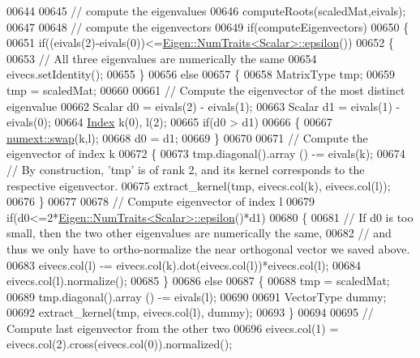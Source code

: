 \begin{DoxyCode}
00644 
00645     \textcolor{comment}{// compute the eigenvalues}
00646     computeRoots(scaledMat,eivals);
00647 
00648     \textcolor{comment}{// compute the eigenvectors}
00649     \textcolor{keywordflow}{if}(computeEigenvectors)
00650     \{
00651       \textcolor{keywordflow}{if}((eivals(2)-eivals(0))<=\hyperlink{group___core___module_struct_eigen_1_1_num_traits}{Eigen::NumTraits<Scalar>::epsilon}())
00652       \{
00653         \textcolor{comment}{// All three eigenvalues are numerically the same}
00654         eivecs.setIdentity();
00655       \}
00656       \textcolor{keywordflow}{else}
00657       \{
00658         MatrixType tmp;
00659         tmp = scaledMat;
00660 
00661         \textcolor{comment}{// Compute the eigenvector of the most distinct eigenvalue}
00662         Scalar d0 = eivals(2) - eivals(1);
00663         Scalar d1 = eivals(1) - eivals(0);
00664         \hyperlink{namespace_eigen_a62e77e0933482dafde8fe197d9a2cfde}{Index} k(0), l(2);
00665         \textcolor{keywordflow}{if}(d0 > d1)
00666         \{
00667           \hyperlink{endian_8c_a3ca5ecd34b04d6a243c054ac3a57f68d}{numext::swap}(k,l);
00668           d0 = d1;
00669         \}
00670 
00671         \textcolor{comment}{// Compute the eigenvector of index k}
00672         \{
00673           tmp.diagonal().array () -= eivals(k);
00674           \textcolor{comment}{// By construction, 'tmp' is of rank 2, and its kernel corresponds to the respective eigenvector.}
00675           extract\_kernel(tmp, eivecs.col(k), eivecs.col(l));
00676         \}
00677 
00678         \textcolor{comment}{// Compute eigenvector of index l}
00679         \textcolor{keywordflow}{if}(d0<=2*\hyperlink{group___core___module_struct_eigen_1_1_num_traits}{Eigen::NumTraits<Scalar>::epsilon}()*d1)
00680         \{
00681           \textcolor{comment}{// If d0 is too small, then the two other eigenvalues are numerically the same,}
00682           \textcolor{comment}{// and thus we only have to ortho-normalize the near orthogonal vector we saved above.}
00683           eivecs.col(l) -= eivecs.col(k).dot(eivecs.col(l))*eivecs.col(l);
00684           eivecs.col(l).normalize();
00685         \}
00686         \textcolor{keywordflow}{else}
00687         \{
00688           tmp = scaledMat;
00689           tmp.diagonal().array () -= eivals(l);
00690 
00691           VectorType dummy;
00692           extract\_kernel(tmp, eivecs.col(l), dummy);
00693         \}
00694 
00695         \textcolor{comment}{// Compute last eigenvector from the other two}
00696         eivecs.col(1) = eivecs.col(2).cross(eivecs.col(0)).normalized();

\end{DoxyCode}
